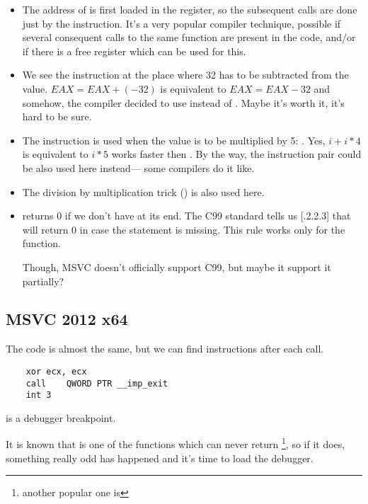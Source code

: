 \begin{itemize}
\item The address of \printf is first loaded in the 
\ESI register, so the subsequent
\printf calls are done just by the  instruction.
It's a very popular compiler 
technique, possible if several consequent calls to the same function are present
in the code, and/or if there is a free register which can be used for this.

\item We see the  
instruction at the place where 32 has to be subtracted from the value.
$EAX=EAX+(-32)$ is equivalent to $EAX=EAX-32$ 
and somehow, the compiler decided to use  instead of .
Maybe it's worth it, it's hard to be sure.

\item The \LEA instruction is used when 
the value is to be multiplied by 5: .
Yes, $i+i*4$ is equivalent to $i*5$ \AndENRU \LEA 
works faster then .
By the way, the  instruction pair could be also used here instead---
some compilers do it like.

\item The division by multiplication trick () 
is also used here.

\item \main returns 0 if we don't have  
at its end.
The C99 standard tells us [.2.2.3] that \main 
will return 0 in case the 
 statement is missing.
This rule works only for the \main function.

Though, MSVC doesn't officially support C99, but maybe it support it partially?
\end{itemize}

\subsection{\Optimizing MSVC 2012 x64}

The code is almost the same, but we can find  instructions after each  call.

\begin{lstlisting}
	xor	ecx, ecx
	call	QWORD PTR __imp_exit
	int	3
\end{lstlisting}

 is a debugger breakpoint.

It is known that  is one of the functions which can never return
\footnote{another popular one is },
so if it does, something really odd has happened and it's time to load the debugger.

